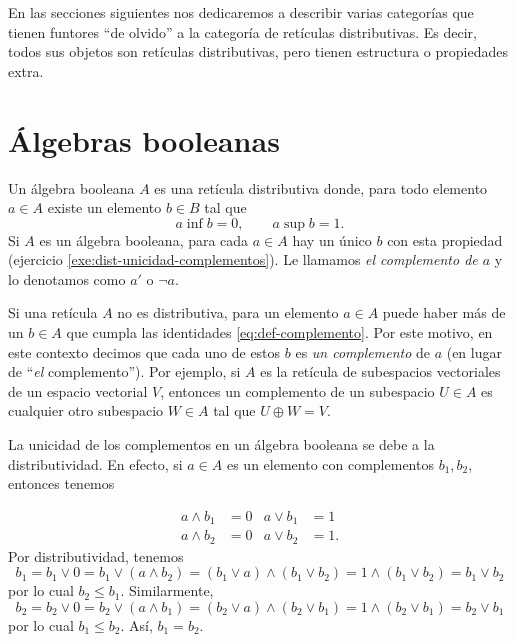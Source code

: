 En las secciones siguientes nos dedicaremos a describir varias
categorías que tienen funtores ``de olvido'' a la categoría de
retículas distributivas. Es decir, todos sus objetos son retículas
distributivas, pero tienen estructura o propiedades extra.

\section{Álgebras booleanas}
\label{ss:complementos-algebras-booleanas}

\begin{definition}
  Un álgebra booleana $A$ es una retícula distributiva
  donde, para todo elemento $a\in A$ existe un elemento $b\in B$ tal
  que
  \begin{equation}\label{eq:def-complemento}
    a\inf b = 0, \qquad a\sup b = 1.
  \end{equation}
  Si $A$ es un álgebra booleana, para cada $a\in A$ hay un único $b$
  con esta propiedad (ejercicio \ref{exe:dist-unicidad-complementos}).
  Le llamamos \emph{el complemento de $a$} y lo denotamos como $a'$ o
  $\neg a$.
\end{definition}

Si una retícula $A$ no es distributiva, para un elemento $a\in A$
puede haber más de un $b\in A$ que cumpla las identidades
\ref{eq:def-complemento}. Por este motivo, en este contexto decimos
que cada uno de estos $b$ es \emph{un complemento} de $a$ (en lugar de
``\emph{el} complemento'').
Por ejemplo, si $A$ es la retícula de
subespacios vectoriales de un espacio vectorial $V$,
entonces un complemento de un subespacio $U\in A$ es cualquier otro
subespacio $W\in A$ tal que $U\oplus W=V$.

La unicidad de los complementos en un álgebra booleana se debe
a la distributividad. En efecto, si $a\in A$ es un elemento con
complementos $b_1,b_2$, entonces tenemos

  \begin{align*}
    a\wedge b_1&=0 & a\vee b_1&=1 \\
    a\wedge b_2&=0 & a\vee b_2&=1.
  \end{align*}
  Por distributividad, tenemos
  \[
    b_1
    =b_1\vee 0
    =b_1\vee (a\wedge b_2)
    =(b_1\vee a)\wedge (b_1\vee b_2)
    =1\wedge (b_1\vee b_2)
    =b_1\vee b_2
  \]
  por lo cual $b_2\leq b_1$.
  Similarmente,
  \[
    b_2
    =b_2\vee 0
    =b_2\vee (a \wedge b_1)
    =(b_2\vee a)\wedge (b_2\vee b_1)
    =1\wedge (b_2\vee b_1)
    =b_2\vee b_1
  \]
  por lo cual $b_1\leq b_2$.
  Así, $b_1=b_2$.

